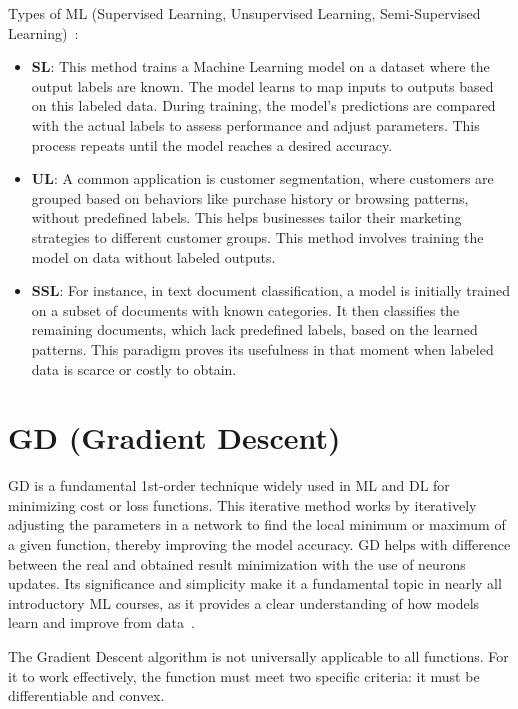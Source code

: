 \documentclass[12pt,a4paper]{report}
\begin{document}
Types of ML (Supervised Learning, Unsupervised Learning, Semi-Supervised Learning)~\cite{machinelearning}:
\begin{itemize}
  \item \textbf{SL}: This method trains a Machine Learning model on a dataset where the output labels are known. The model learns to map inputs to outputs based on this labeled data. During training, the model's predictions are compared with the actual labels to assess performance and adjust parameters. This process repeats until the model reaches a desired accuracy.
  \item \textbf{UL}: A common application is customer segmentation, where customers are grouped based on behaviors like purchase history or browsing patterns, without predefined labels. This helps businesses tailor their marketing strategies to different customer groups. This method involves training the model on data without labeled outputs.
  \item \textbf{SSL}: For instance, in text document classification, a model is initially trained on a subset of documents with known categories. It then classifies the remaining documents, which lack predefined labels, based on the learned patterns. This paradigm proves its usefulness in that moment when labeled data is scarce or costly to obtain.
\end{itemize}

\section{GD (Gradient Descent)}\vspace{-12pt}
GD is a fundamental 1st-order technique widely used in ML and DL for minimizing cost or loss functions. This iterative method works by iteratively adjusting the parameters in a network to find the local minimum or maximum of a given function, thereby improving the model accuracy. GD helps with difference between the real and obtained result minimization with the use of neurons updates. Its significance and simplicity make it a fundamental topic in nearly all introductory ML courses, as it provides a clear understanding of how models learn and improve from data~\cite{gradientdescent}.

The Gradient Descent algorithm is not universally applicable to all functions. For it to work effectively, the function must meet two specific criteria: it must be differentiable and convex.
\end{document}

